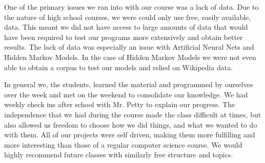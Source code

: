 \documentclass[11pt,a4paper]{article}
\begin{document}
One of the primary issues we ran into with our course was a lack of data. Due to the nature of high school courses, we were could only use free, easily available, data. This meant we did not have access to large amounts of data that would have been required to test our programs more extensively and obtain better results. The lack of data was especially an issue with Artificial Neural Nets and Hidden Markov Models. In the case of Hidden Markov Models we were not even able to obtain a corpus to test our models and relied on Wikipedia data.

In general we, the students, learned the material and programmed by ourselves over the week and met on the weekend to consolidate our knowledge. We had weekly check ins after school with Mr. Petty to explain our progress. The independence that we had during the course made the class difficult at times, but also allowed us freedom to choose how we did things, and what we wanted to do with them. All of our projects were self driven, making them more fulfilling and more interesting than those of a regular computer science course. We would highly recommend future classes with similarly free structure and topics.


\end{document}
